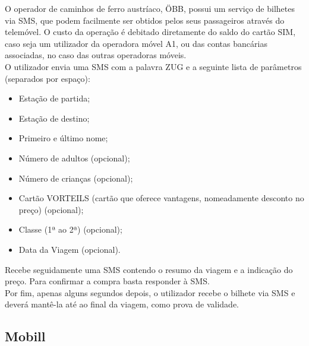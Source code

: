 O operador de caminhos de ferro austríaco, ÖBB, possui um serviço de bilhetes via SMS, que podem facilmente ser obtidos pelos seus passageiros através do telemóvel. O custo da operação é debitado diretamente do saldo do cartão SIM, caso seja um utilizador da operadora móvel A1, ou das contas bancárias associadas, no caso das outras operadoras móveis.
\\O utilizador envia uma SMS com a palavra ZUG e a seguinte lista de parâmetros (separados por espaço):
\begin{itemize}
\item Estação de partida;
\item Estação de destino;
\item Primeiro e último nome;
\item Número de adultos (opcional);
\item Número de crianças (opcional);
\item Cartão VORTEILS (cartão que oferece vantagens, nomeadamente desconto no preço) (opcional);
\item Classe (1ª ao 2ª) (opcional);
\item Data da Viagem (opcional).
\end{itemize}
Recebe seguidamente uma SMS contendo o resumo da viagem e a indicação do preço. Para confirmar a compra basta responder à SMS.
\\Por fim, apenas alguns segundos depois, o utilizador recebe o bilhete via SMS e deverá mantê-la até ao final da viagem, como prova de validade. \cite{obb}

\subsection{Mobill} 

